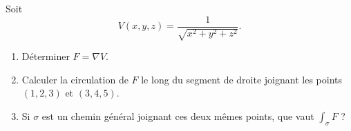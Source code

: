 
\begin{exercice}\label{exoOutilsMath-0062}

    Soit 
    \begin{equation}
        V(x,y,z)=\frac{1}{ \sqrt{x^2+y^2+z^2} }.
    \end{equation}
    \begin{enumerate}
        \item
            Déterminer $F=\nabla V$.
        \item
            Calculer la circulation de $F$ le long du segment de droite joignant les points $(1,2,3)$ et $(3,4,5)$.
        \item
            Si $\sigma$ est un chemin général joignant ces deux mêmes points, que vaut $\int_{\sigma}F$ ?
    \end{enumerate}

\end{exercice}
